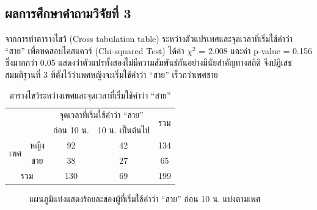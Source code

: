 \documentclass[a4paper]{article}
\begin{document}
\subsection{ผลการศึกษาคำถามวิจัยที่ 3}
    จากการทำตารางไขว้ (Cross tabulation table) ระหว่างตัวแปรเพศและจุดเวลาที่เริ่มใช้คำว่า “สาย” เพื่อทดสอบ\break ไคสแควร์ (Chi-squared Test) ได้ค่า $\chi^2$ = 2.008 และค่า p-value = 0.156 ซึ่งมากกว่า 0.05 แสดงว่าตัวแปรทั้งสองไม่มีความสัมพันธ์กันอย่างมีนัยสำคัญทางสถิติ จึงปฏิเสธสมมติฐานที่ 3 ที่ตั้งไว้ว่าเพศหญิงจะเริ่มใช้คำว่า “สาย” เร็วกว่าเพศชาย
    \begin{table}[!ht]
        \begin{center}
        \begin{tabular}{|c|c|c|c|c|}
            \cline{3-5}
            \multicolumn{2}{c|}{} & \multicolumn{2}{c|}{จุดเวลาที่เริ่มใช้คำว่า “สาย”} & \multirow{2}{*}{รวม} \\
            \cline{3-4}
            \multicolumn{2}{c|}{} & ก่อน 10 น. & 10 น. เป็นต้นไป & \\
            \hline
            \multirow{2}{*}{เพศ} & หญิง & 92 & 42 & 134 \\
            \cline{2-5}
            & ชาย & 38 & 27 & 65 \\
            \hline
            \multicolumn{2}{|c|}{รวม} & 130 & 69 & 199 \\
            \hline
        \end{tabular}
        \end{center}
        \caption{ตารางไขว้ระหว่างเพศและจุดเวลาที่เริ่มใช้คำว่า “สาย”}
    \end{table}
    \begin{figure}[!ht]
        \begin{center}
        \end{center}
        \caption{แผนภูมิแท่งแสดงร้อยละของผู้ที่เริ่มใช้คำว่า “สาย” ก่อน 10 น. แบ่งตามเพศ}
    \end{figure}
    \newpage
\end{document}
